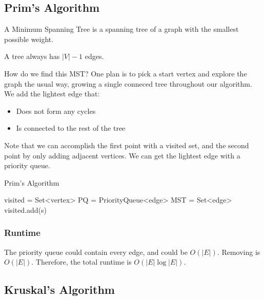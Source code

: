 
\subsection{Prim's Algorithm}

A Minimum Spanning Tree is a spanning tree of a graph with the smallest possible weight. 

\begin{note}
	A tree always has \( |V|-1 \) edges.
\end{note}

How do we find this MST? One plan is to pick a start vertex and explore the graph the usual way, growing a single conneced tree throughout our algorithm. We add the lightest edge that:
\begin{itemize}
	\item Does not form any cycles
	\item Is connected to the rest of the tree
\end{itemize}

Note that we can accomplish the first point with a visited set, and the second point by only adding adjacent vertices. We can get the lightest edge with a priority queue. 

\begin{algorithm}
	\caption{Prim's Algorithm}
	visited = Set<vertex>\;
	PQ = PriorityQueue<edge>\;
	MST = Set<edge>\;
	visited.add(s)\;

\end{algorithm}

\subsubsection{Runtime}

The priority queue could contain every edge, and could be \( O(|E|) \). Removing is \( O(|E|) \). Therefore, the total runtime is \( O(|E| \log |E|) \). 

\subsection{Kruskal's Algorithm}

